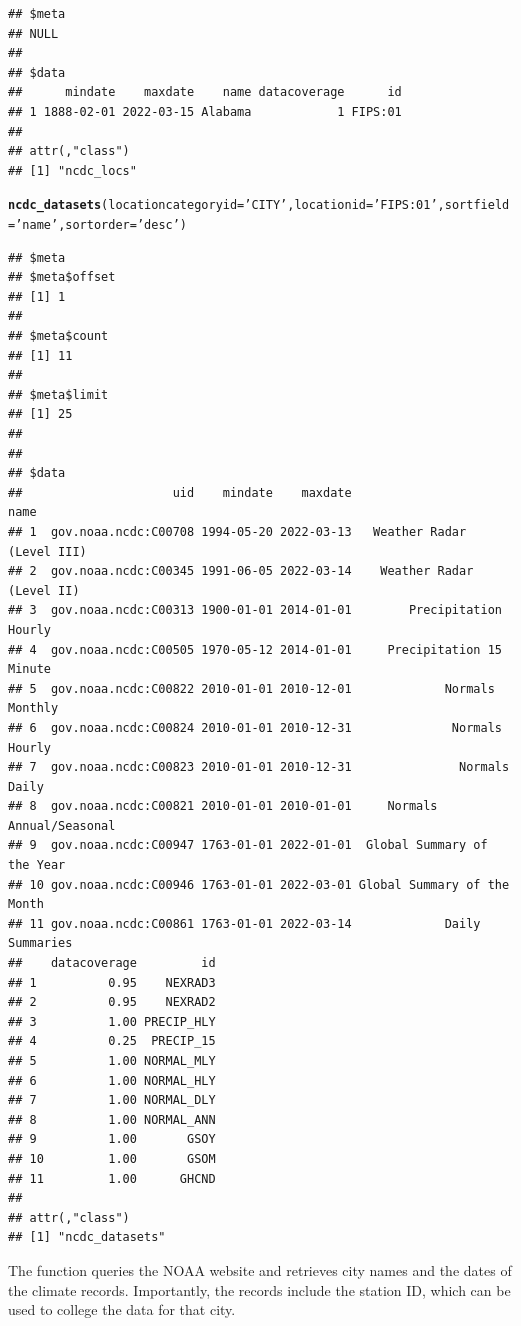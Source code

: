 \documentclass{article}\usepackage[]{graphicx}\usepackage[]{color}
\makeatletter
\newcommand{\hlstr}[1]{\textcolor[rgb]{0.192,0.494,0.8}{#1}}%
\newcommand{\hlstd}[1]{\textcolor[rgb]{0.345,0.345,0.345}{#1}}%
\newcommand{\hlkwc}[1]{\textcolor[rgb]{0.333,0.667,0.333}{#1}}%
\newcommand{\hlkwd}[1]{\textcolor[rgb]{0.737,0.353,0.396}{\textbf{#1}}}%
\newenvironment{kframe}{%
 \def\at@end@of@kframe{}%
 \ifinner\ifhmode%
  \def\at@end@of@kframe{\end{minipage}}%
  \begin{minipage}{\columnwidth}%
 \fi\fi%
 \def\FrameCommand##1{\hskip\@totalleftmargin \hskip-\fboxsep
 \colorbox{shadecolor}{##1}\hskip-\fboxsep
     \hskip-\linewidth \hskip-\@totalleftmargin \hskip\columnwidth}%
 \MakeFramed {\advance\hsize-\width
   \@totalleftmargin\z@ \linewidth\hsize
   \@setminipage}}%
 {\par\unskip\endMakeFramed%
 \at@end@of@kframe}
\newenvironment{knitrout}{}{} %
\makeatother
\begin{document}
\begin{knitrout}
\begin{kframe}
\begin{verbatim}
## $meta
## NULL
## 
## $data
##      mindate    maxdate    name datacoverage      id
## 1 1888-02-01 2022-03-15 Alabama            1 FIPS:01
## 
## attr(,"class")
## [1] "ncdc_locs"
\end{verbatim}
\begin{alltt}
\hlkwd{ncdc_datasets}\hlstd{(}\hlkwc{locationcategoryid}\hlstd{=}\hlstr{'CITY'}\hlstd{,} \hlkwc{locationid}\hlstd{=}\hlstr{'FIPS:01'}\hlstd{,} \hlkwc{sortfield}\hlstd{=}\hlstr{'name'}\hlstd{,} \hlkwc{sortorder}\hlstd{=}\hlstr{'desc'}\hlstd{)}
\end{alltt}
\begin{verbatim}
## $meta
## $meta$offset
## [1] 1
## 
## $meta$count
## [1] 11
## 
## $meta$limit
## [1] 25
## 
## 
## $data
##                     uid    mindate    maxdate                        name
## 1  gov.noaa.ncdc:C00708 1994-05-20 2022-03-13   Weather Radar (Level III)
## 2  gov.noaa.ncdc:C00345 1991-06-05 2022-03-14    Weather Radar (Level II)
## 3  gov.noaa.ncdc:C00313 1900-01-01 2014-01-01        Precipitation Hourly
## 4  gov.noaa.ncdc:C00505 1970-05-12 2014-01-01     Precipitation 15 Minute
## 5  gov.noaa.ncdc:C00822 2010-01-01 2010-12-01             Normals Monthly
## 6  gov.noaa.ncdc:C00824 2010-01-01 2010-12-31              Normals Hourly
## 7  gov.noaa.ncdc:C00823 2010-01-01 2010-12-31               Normals Daily
## 8  gov.noaa.ncdc:C00821 2010-01-01 2010-01-01     Normals Annual/Seasonal
## 9  gov.noaa.ncdc:C00947 1763-01-01 2022-01-01  Global Summary of the Year
## 10 gov.noaa.ncdc:C00946 1763-01-01 2022-03-01 Global Summary of the Month
## 11 gov.noaa.ncdc:C00861 1763-01-01 2022-03-14             Daily Summaries
##    datacoverage         id
## 1          0.95    NEXRAD3
## 2          0.95    NEXRAD2
## 3          1.00 PRECIP_HLY
## 4          0.25  PRECIP_15
## 5          1.00 NORMAL_MLY
## 6          1.00 NORMAL_HLY
## 7          1.00 NORMAL_DLY
## 8          1.00 NORMAL_ANN
## 9          1.00       GSOY
## 10         1.00       GSOM
## 11         1.00      GHCND
## 
## attr(,"class")
## [1] "ncdc_datasets"
\end{verbatim}
\end{kframe}
\end{knitrout}

The function queries the NOAA website and retrieves city names and the dates of the climate records. Importantly, the records include the station ID, which can be used to college the data for that city. 

\end{document}
